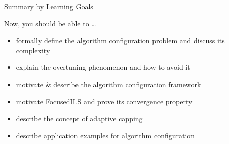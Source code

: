 


\begin{frame}[c]{Summary by Learning Goals}

Now, you should be able to \ldots

\begin{itemize}
  \item \alert{formally} define the algorithm configuration problem and discuss its
  complexity
  \item explain the \alert{overtuning} phenomenon and how to avoid it
\medskip
  \item motivate \& describe the algorithm configuration framework \alert{\paramils{}}
  \item motivate \alert{FocusedILS} and prove its \alert{convergence} property
  \item describe the concept of \alert{adaptive capping}  
\medskip
  \item describe \alert{application examples} for algorithm configuration
\end{itemize}
\end{frame}



